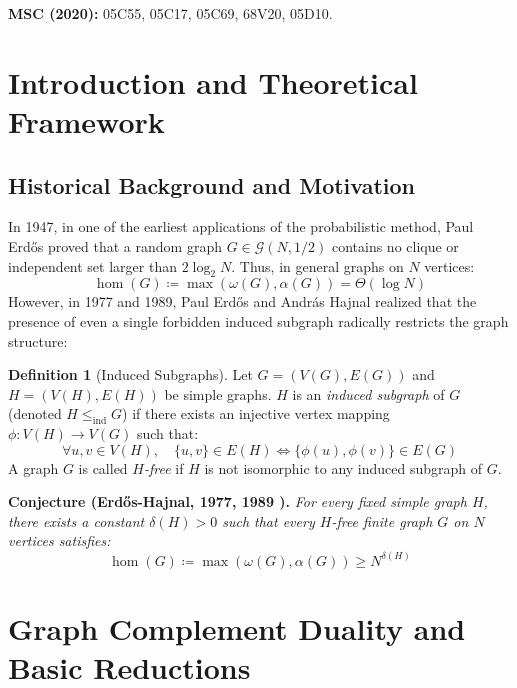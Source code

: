 \documentclass[11pt,a4paper]{article}
\theoremstyle{definition}
\newtheorem{definition}[theorem]{Definition}
\begin{document}
\noindent\textbf{MSC (2020):} 05C55, 05C17, 05C69, 68V20, 05D10.

\tableofcontents
\newpage

\section{Introduction and Theoretical Framework}

\subsection{Historical Background and Motivation}
In 1947, in one of the earliest applications of the probabilistic method, Paul Erd\H{o}s \cite{erdos1947} proved that a random graph $G \in \mathcal{G}(N, 1/2)$ contains no clique or independent set larger than $2 \log_2 N$.
Thus, in general graphs on $N$ vertices:
\begin{equation}\label{eq:ramsey_general}
\operatorname{hom}(G) \coloneqq \max(\omega(G), \alpha(G)) = \Theta(\log N)
\end{equation}
However, in 1977 and 1989, Paul Erd\H{o}s and Andr\'as Hajnal \cite{erdos1977, erdos1989} realized that the presence of even a single forbidden induced subgraph radically restricts the graph structure:

\begin{definition}[Induced Subgraphs]\label{def:ind_subgraph}
Let $G = (V(G), E(G))$ and $H = (V(H), E(H))$ be simple graphs.
$H$ is an \emph{induced subgraph} of $G$ (denoted $H \le_{\mathrm{ind}} G$) if there exists an injective vertex mapping $\phi : V(H) \to V(G)$ such that:
\begin{equation}\label{eq:ind_subgraph}
\forall u, v \in V(H), \quad \{u, v\} \in E(H) \iff \{\phi(u), \phi(v)\} \in E(G)
\end{equation}
A graph $G$ is called \emph{$H$-free} if $H$ is not isomorphic to any induced subgraph of $G$.
\end{definition}

\noindent\textbf{Conjecture (Erd\H{o}s-Hajnal, 1977, 1989 \cite{erdos1989}).} \textit{For every fixed simple graph $H$, there exists a constant $\delta(H) > 0$ such that every $H$-free finite graph $G$ on $N$ vertices satisfies:}
\begin{equation}\label{eq:eh_conjecture}
\operatorname{hom}(G) \coloneqq \max(\omega(G), \alpha(G)) \ge N^{\delta(H)}
\end{equation}

\section{Graph Complement Duality and Basic Reductions}
\end{document}
